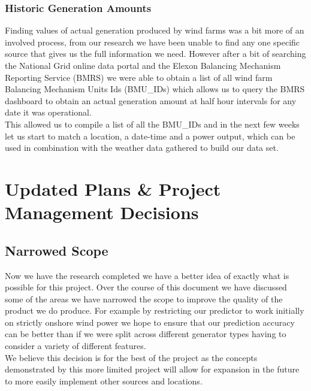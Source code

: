 \documentclass[twoside]{article}
\begin{document}
\subsubsection{Historic Generation Amounts}
Finding values of actual generation produced by wind farms was a bit more of an involved process, from our research we have been unable to find any one specific source that gives us the full information we need. However after a bit of searching the National Grid online data portal \cite{datopian} and the Elexon Balancing Mechanism Reporting Service (BMRS) \cite{elexon} we were able to obtain a list of all wind farm Balancing Mechanism Units Ids (BMU\_IDs) which allows us to query the BMRS dashboard to obtain an actual generation amount at half hour intervals for any date it was operational. \\
\noindent This allowed us to compile a list of all the BMU\_IDs and in the next few weeks let us start to match a location, a date-time and a power output, which can be used in combination with the weather data gathered to build our data set.


\section{Updated Plans \& Project Management Decisions}
\subsection{Narrowed Scope}
Now we have the research completed we have a better idea of exactly what is possible for this project. Over the course of this document we have discussed some of the areas we have narrowed the scope to improve the quality of the product we do produce. For example by restricting our predictor to work initially on strictly onshore wind power we hope to ensure that our prediction accuracy can be better than if we were split across different generator types having to consider a variety of different features. \\
\noindent We believe this decision is for the best of the project as the concepts demonstrated by this more limited project will allow for expansion in the future to more easily implement other sources and locations. 
\end{document}
